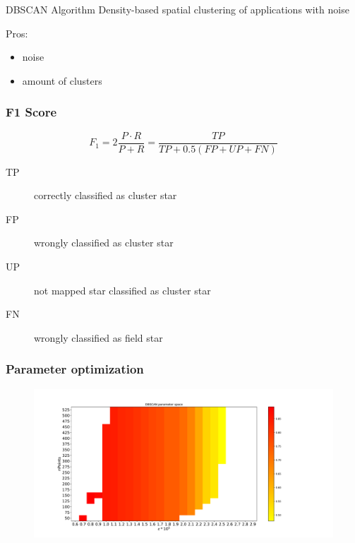 \documentclass{beamer}
\begin{document}
\begin{frame}

\begin{block}{DBSCAN Algorithm}
Density-based spatial clustering of applications with noise
\end{block}

Pros:
\begin{itemize}
\item noise
\item amount of clusters
\end{itemize}

\end{frame}


\begin{frame}
\frametitle{F1 Score}
\begin{equation*}
F_1 = 2 \frac{P \cdot R}{P+R} = \frac{TP}{TP+0.5(FP+UP+FN)}
\end{equation*}
\vspace{\baselineskip}
\begin{description}
\item[TP] correctly classified as cluster star
\item[FP] wrongly classified as cluster star
\item[UP] not mapped star classified as cluster star
\item[FN] wrongly classified as field star
\end{description}


\end{frame}

\begin{frame}
\frametitle{Parameter optimization}
\begin{figure}
\centering
\includegraphics[width=\textwidth,height=\textheight,keepaspectratio]{Images/DBSCAN_parameter_space.pdf}
\end{figure}

\end{frame}
\end{document}
